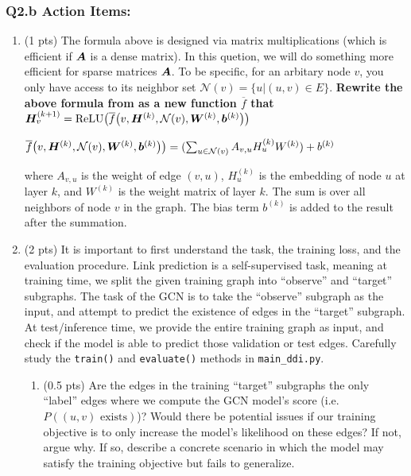 %
\hfill

%
\subsubsection*{Q2.b Action Items:}
%
\begin{enumerate}
%
\item
    (1 pts)
    The formula above is designed via matrix multiplications (which is efficient if $\bm{A}$
    is a dense matrix).
    In this quetion, we will do something more efficient for sparse matrices $\bm{A}$.
    To be specific, for an arbitary node $v$, you only have access to its
    neighbor set $\mathcal{N}(v) = \{u | (u, v) \in E \}$.
    \textbf{%
        Rewrite the above formula from  as a new function
        $\overline{f}$ that $\bm{H}^{(k + 1)}_{v} = \text{ReLU}\big( \overline{f}
        \big( v, \bm{H}^{(k)}, \mathcal{N}(v), \bm{W}^{(k)}, \bm{b}^{(k)}\big) \big)$
    }

    $\overline{f} \big( v, \bm{H}^{(k)}, \mathcal{N}(v), \bm{W}^{(k)}, \bm{b}^{(k)}\big) \big) = (\sum_{u \in \mathcal{N}(v)} A_{v,u} H_u^{(k)} W^{(k)}) + b^{(k)}$

    where $A_{v,u}$ is the weight of edge $(v,u)$, $H_u^{(k)}$ is the embedding
    of node $u$ at layer $k$, and $W^{(k)}$ is the weight matrix of layer $k$.
    The sum is over all neighbors of node $v$ in the graph. The bias term
    $b^{(k)}$ is added to the result after the summation.
%

\item
    (2 pts)
    It is important to first understand the task, the training loss, and the evaluation procedure. Link prediction is a self-supervised task, meaning at training time, we split the given training graph into ``observe'' and ``target'' subgraphs. The task of the GCN is to take the ``observe'' subgraph as the input, and attempt to predict the existence of edges in the ``target'' subgraph. At test/inference time, we provide the entire training graph as input, and check if the model is able to predict those validation or test edges. Carefully study the \texttt{train()} and \texttt{evaluate()} methods in \texttt{main\_ddi.py}.

    \begin{enumerate}

        \item (0.5 pts) Are the edges in the training ``target'' subgraphs the
        only ``label'' edges where we compute the GCN model's score (i.e. $P((u,
        v) \text{~exists})$)? Would there be potential issues if our training
        objective is to only increase the model's likelihood on these edges? If
        not, argue why. If so, describe a concrete scenario in which the model
        may satisfy the training objective but fails to generalize. 


\end{enumerate}
\end{enumerate}
